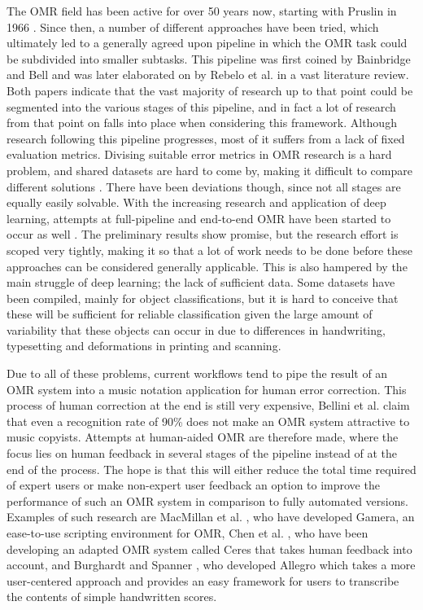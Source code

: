 The OMR field has been active for over 50 years now, starting with Pruslin in 1966 \citep{Pruslin1992}. Since then, a number of different approaches have been tried, which ultimately led to a generally agreed upon pipeline in which the OMR task could be subdivided into smaller subtasks. This pipeline was first coined by Bainbridge and Bell \citep{Bainbridge2001} and was later elaborated on by Rebelo et al. \citep{Rebelo2012} in a vast literature review. Both papers indicate that the vast majority of research up to that point could be segmented into the various stages of this pipeline, and in fact a lot of research from that point on falls into place when considering this framework. Although research following this pipeline progresses, most of it suffers from a lack of fixed evaluation metrics. Divising suitable error metrics in OMR research is a hard problem, and shared datasets are hard to come by, making it difficult to compare different solutions \citep{Bellini2007, Byrd2015}. There have been deviations though, since not all stages are equally easily solvable. With the increasing research and application of deep learning, attempts at full-pipeline and end-to-end OMR have been started to occur as well \citep{CalvoZaragoza2017, Pacha2019, Wel2017}. The preliminary results show promise, but the research effort is scoped very tightly, making it so that a lot of work needs to be done before these approaches can be considered generally applicable. This is also hampered by the main struggle of deep learning; the lack of sufficient data. Some datasets have been compiled, mainly for object classifications, but it is hard to conceive that these will be sufficient for reliable classification given the large amount of variability that these objects can occur in due to differences in handwriting, typesetting and deformations in printing and scanning.

Due to all of these problems, current workflows tend to pipe the result of an OMR system into a music notation application for human error correction. This process of human correction at the end is still very expensive, Bellini et al. \citep{Bellini2007} claim that even a recognition rate of 90\% does not make an OMR system attractive to music copyists. Attempts at human-aided OMR are therefore made, where the focus lies on human feedback in several stages of the pipeline instead of at the end of the process. The hope is that this will either reduce the total time required of expert users or make non-expert user feedback an option to improve the performance of such an OMR system in comparison to fully automated versions. Examples of such research are MacMillan et al. \citep{Macmillan2002}, who have developed Gamera, an ease-to-use scripting environment for OMR, Chen et al. \citep{Chen2016, Chen2016b}, who have been developing an adapted OMR system called Ceres that takes human feedback into account, and Burghardt and Spanner \citep{Burghardt2017}, who developed Allegro which takes a more user-centered approach and provides an easy framework for users to transcribe the contents of simple handwritten scores.


